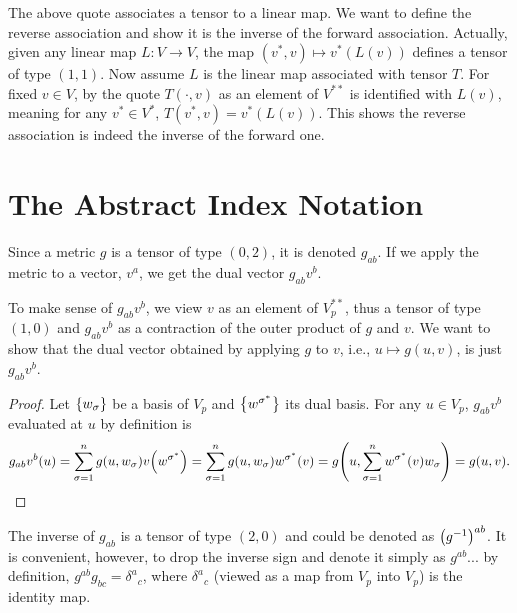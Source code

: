 \documentclass{note}
\numberwithin{equation}{chapter}
\begin{document}
The above quote associates a tensor to a linear map. We want to define the
reverse association and show it is the inverse of the forward association.
Actually, given any linear map $L\colon V \to V$, the map $(v^*, v) \mapsto
    v^*(L(v))$ defines a tensor of type $(1,1)$. Now assume $L$ is the linear map
associated with tensor $T$. For fixed $v \in V$, by the quote $T(\cdot,v)$ as
an element of $V^{**}$ is identified with $L(v)$, meaning for any $v^* \in
    V^*$, $T(v^*,v) = v^*(L(v))$. This shows the reverse association is indeed the
inverse of the forward one.

\setcounter{section}{3}
\section{The Abstract Index Notation}


\begin{quotebar}
    Since a metric $g$ is a tensor of type $(0,2)$, it is denoted $g_{ab}$. If we
    apply the metric to a vector, $v^a$, we get the dual vector $g_{ab}v^b$.
\end{quotebar}

To make sense of $g_{ab}v^b$, we view $v$ as an element of $V_p^{**}$, thus a
tensor of type $(1,0)$ and $g_{ab}v^b$ as a contraction of the outer product of
$g$ and $v$. We want to show that the dual vector obtained by applying $g$ to
$v$, i.e., $u \mapsto g(u,v)$, is just $g_{ab}v^b$.
\begin{proof}
    Let $\set{w_\sigma}$ be a basis of $V_p$ and $\set{w^{\sigma^*}}$ its dual
    basis. For any $u \in V_p$, $g_{ab}v^b$ evaluated at $u$ by definition is
    \begin{equation}
        g_{ab}v^b(u) = \sum_{\sigma=1}^n g(u, w_\sigma)v\prn{w^{\sigma^*}} =
        \sum_{\sigma=1}^n g(u, w_\sigma)w^{\sigma^*}(v) = g\prn{u, \sum_{\sigma=1}^n
            w^{\sigma^*}(v) w_\sigma} = g(u,v). \label{eq:contraction-technique} \qedhere
    \end{equation}
\end{proof}

\begin{quotebar}
    The inverse of $g_{ab}$ is a tensor of type $(2,0)$ and could be denoted as
    $\prn{g^{-1}}^{ab}$. It is convenient, however, to drop the inverse sign and
    denote it simply as $g^{ab}$... by definition, $g^{ab}g_{bc} = {\delta^a}_c$,
    where ${\delta^a}_c$ (viewed as a map from $V_p$ into $V_p$) is the identity
    map.
\end{quotebar}
\end{document}
